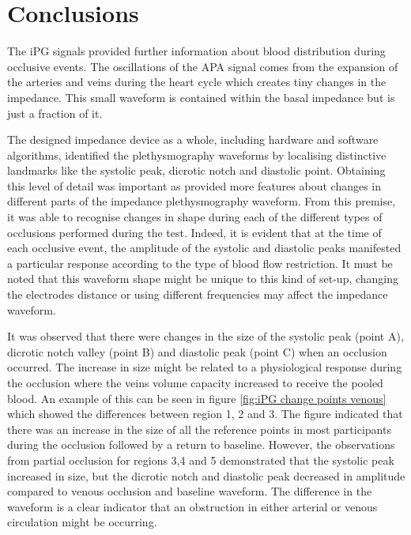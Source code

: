 \section{Conclusions}
\label{section apa 4}
The iPG signals provided further information about blood distribution during occlusive events. The oscillations of the APA signal comes from the expansion of the arteries and veins during the heart cycle which creates tiny changes in the impedance. This small waveform is contained within the basal impedance but is just a fraction of it. 

The designed impedance device as a whole, including hardware and software algorithms, identified the plethysmography waveforms by localising distinctive landmarks like the systolic peak, dicrotic notch and diastolic point. Obtaining this level of detail was important as provided more features about changes in different parts of the impedance plethysmography waveform. From this premise, it was able to recognise changes in shape during each of the different types of occlusions performed during the test.  Indeed, it is evident that at the time of each occlusive event, the amplitude of the systolic and diastolic peaks manifested a particular response according to the type of blood flow restriction. It must be noted that this waveform shape might be unique to this kind of set-up, changing the electrodes distance or using different frequencies may affect the impedance waveform.

It was observed that there were changes in the size of the systolic peak (point A), dicrotic notch valley (point B) and diastolic peak (point C) when an occlusion occurred. The increase in size might be related to a physiological response during the occlusion where the veins volume capacity increased to receive the pooled blood. An example of this can be seen in figure \ref{fig:iPG change points venous} which showed the differences between region 1, 2 and 3. The figure indicated that there was an increase in the size of all the reference points in most participants during the occlusion followed by a return to baseline. However, the observations from partial occlusion for regions 3,4 and 5 demonstrated that the systolic peak increased in size, but the dicrotic notch and diastolic peak decreased in amplitude compared to venous occlusion and baseline waveform. The difference in the waveform is a clear indicator that an obstruction in either arterial or venous circulation might be occurring. 

